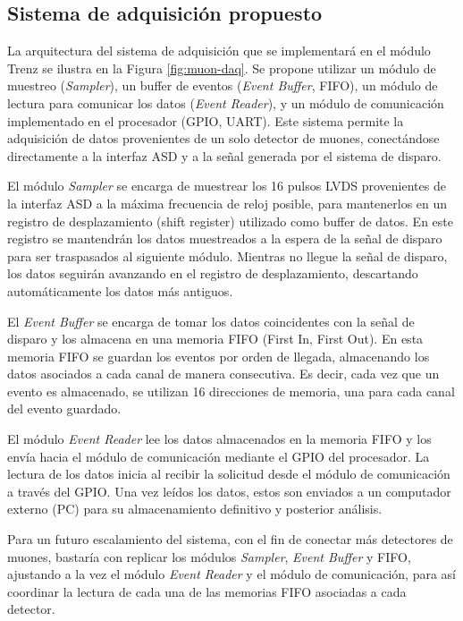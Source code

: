 	\subsection{Sistema de adquisición propuesto}
		La arquitectura del sistema de adquisición que se implementará en el módulo Trenz se ilustra en la Figura \ref{fig:muon-daq}. Se propone utilizar un módulo de muestreo (\textit{Sampler}), un buffer de eventos (\textit{Event Buffer}, FIFO), un módulo de lectura para comunicar los datos (\textit{Event Reader}), y un módulo de comunicación implementado en el procesador (GPIO, UART). Este sistema permite la adquisición de datos provenientes de un solo detector de muones, conectándose directamente a la interfaz ASD y a la señal generada por el sistema de disparo.
		
		El módulo \textit{Sampler} se encarga de muestrear los 16 pulsos LVDS provenientes de la interfaz ASD a la máxima frecuencia de reloj posible, para mantenerlos en un registro de desplazamiento (shift register) utilizado como buffer de datos. En este registro se mantendrán los datos muestreados a la espera de la señal de disparo para ser traspasados al siguiente módulo. Mientras no llegue la señal de disparo, los datos seguirán avanzando en el registro de desplazamiento, descartando automáticamente los datos más antiguos.
		
		El \textit{Event Buffer} se encarga de tomar los datos coincidentes con la señal de disparo y los almacena en una memoria FIFO (First In, First Out)\cite{XilinxFIFOSuite}. En esta memoria FIFO se guardan los eventos por orden de llegada, almacenando los datos asociados a cada canal de manera consecutiva. Es decir, cada vez que un evento es almacenado, se utilizan 16 direcciones de memoria, una para cada canal del evento guardado.
		
		El módulo \textit{Event Reader} lee los datos almacenados en la memoria FIFO y los envía hacia el módulo de comunicación mediante el GPIO del procesador. La lectura de los datos inicia al recibir la solicitud desde el módulo de comunicación a través del GPIO. Una vez leídos los datos, estos son enviados a un computador externo (PC) para su almacenamiento definitivo y posterior análisis.
		
		Para un futuro escalamiento del sistema, con el fin de conectar más detectores de muones, bastaría con replicar los módulos \textit{Sampler}, \textit{Event Buffer} y FIFO, ajustando a la vez el módulo \textit{Event Reader} y el módulo de comunicación, para así coordinar la lectura de cada una de las memorias FIFO asociadas a cada detector.
		
